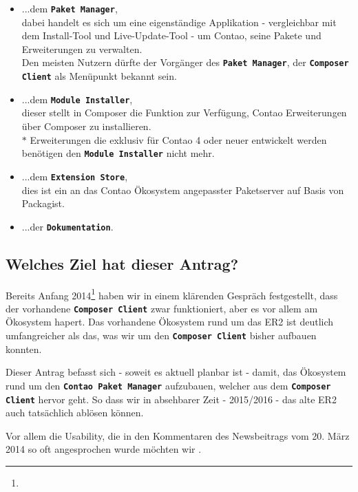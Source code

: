 \documentclass[
paper=a4,
draft=false,%
fontsize=10pt%
]{scrartcl}
\newcommand{\contaoPackageManager}{\textbf{\texttt{Contao Paket Manager}}}
\newcommand{\packageManager}{\textbf{\texttt{Paket Manager}}}
\newcommand{\moduleInstaller}{\textbf{\texttt{Module Installer}}}
\newcommand{\store}{\textbf{\texttt{Extension Store}}}
\newcommand{\documentation}{\textbf{\texttt{Dokumentation}}}
\newcommand{\composerClient}{\textbf{\texttt{Composer Client}}}
\begin{document}
\begin{itemize}
\item ...dem \packageManager{}, \\
dabei handelt es sich um eine eigenständige Applikation - vergleichbar mit dem Install-Tool und Live-Update-Tool - um Contao, seine Pakete und Erweiterungen zu verwalten. \\
Den meisten Nutzern dürfte der Vorgänger des \packageManager{}, der \composerClient{} als Menüpunkt  bekannt sein.

\item ...dem \moduleInstaller{}, \\
dieser stellt in Composer die Funktion zur Verfügung, Contao Erweiterungen über Composer zu installieren. \\
$ \ast $ Erweiterungen die exklusiv für Contao 4 oder neuer entwickelt werden benötigen den \moduleInstaller{} nicht mehr.

\item ...dem \store{}, \\
dies ist ein an das Contao Ökosystem angepasster Paketserver auf Basis von Packagist.

\item ...der \documentation{}.
\end{itemize}

\pagebreak

\subsection*{Welches Ziel hat dieser Antrag?}

Bereits Anfang 2014\footnote{} haben wir in einem klärenden Gespräch festgestellt, dass der vorhandene \composerClient{} zwar funktioniert, aber es vor allem am Ökosystem hapert. Das vorhandene Ökosystem rund um das ER2 ist deutlich umfangreicher als das, was wir um den \composerClient{} bisher aufbauen konnten.

Dieser Antrag befasst sich - soweit es aktuell planbar ist - damit, das Ökosystem rund um den \contaoPackageManager{} aufzubauen, welcher aus dem \composerClient{} hervor geht. So dass wir in absehbarer Zeit - 2015/2016 - das alte ER2 auch tatsächlich ablösen können.

Vor allem die  Usability, die in den Kommentaren des Newsbeitrags vom 20. März 2014 so oft angesprochen wurde möchten wir .
\end{document}
